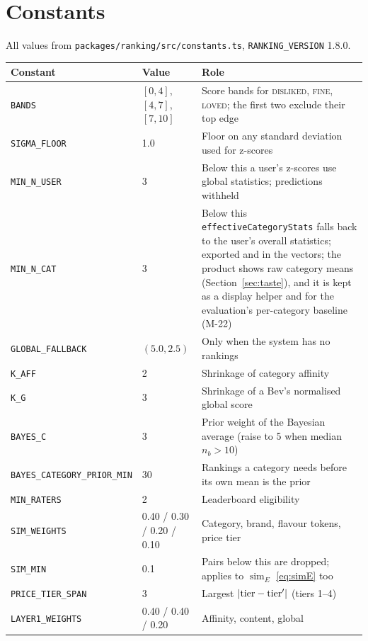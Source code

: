 \documentclass[11pt]{article}
\DeclarePairedDelimiter\abs{\lvert}{\rvert}
\DeclareMathOperator{\simi}{sim}
\newcommand{\code}[1]{\texttt{#1}}
\theoremstyle{plain}
\theoremstyle{definition}
\theoremstyle{remark}
\begin{document}
\section{Constants}\label{app:constants}

All values from \code{packages/ranking/src/constants.ts}, \code{RANKING\_VERSION} 1.8.0.

\begin{center}
\small
\begin{tabular}{@{}p{5.1cm}p{2.7cm}p{6.6cm}@{}}
\toprule
Constant & Value & Role \\
\midrule
\code{BANDS} & $[0,4]$, $[4,7]$, $[7,10]$ & Score bands for \textsc{disliked}, \textsc{fine}, \textsc{loved}; the first two exclude their top edge \\
\code{SIGMA\_FLOOR} & 1.0 & Floor on any standard deviation used for z-scores \\
\code{MIN\_N\_USER} & 3 & Below this a user's z-scores use global statistics; predictions withheld \\
\code{MIN\_N\_CAT} & 3 & Below this \code{effectiveCategoryStats} falls back to the user's overall statistics; exported and in the vectors; the product shows raw category means (Section~\ref{sec:taste}), and it is kept as a display helper and for the evaluation's per-category baseline (M-22) \\
\code{GLOBAL\_FALLBACK} & $(5.0, 2.5)$ & Only when the system has no rankings \\
\code{K\_AFF} & 2 & Shrinkage of category affinity \\
\code{K\_G} & 3 & Shrinkage of a Bev's normalised global score \\
\code{BAYES\_C} & 3 & Prior weight of the Bayesian average (raise to 5 when median $n_b > 10$) \\
\code{BAYES\_CATEGORY\_PRIOR\_MIN} & 30 & Rankings a category needs before its own mean is the prior \\
\code{MIN\_RATERS} & 2 & Leaderboard eligibility \\
\code{SIM\_WEIGHTS} & 0.40 / 0.30 / 0.20 / 0.10 & Category, brand, flavour tokens, price tier \\
\code{SIM\_MIN} & 0.1 & Pairs below this are dropped; applies to $\simi_E$ \eqref{eq:simE} too \\
\code{PRICE\_TIER\_SPAN} & 3 & Largest $\abs{\mathrm{tier} - \mathrm{tier}'}$ (tiers 1--4) \\
\code{LAYER1\_WEIGHTS} & 0.40 / 0.40 / 0.20 & Affinity, content, global \\

\end{tabular}
\end{center}
\end{document}
